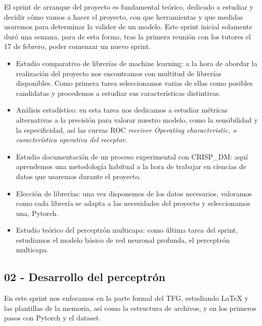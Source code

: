 El sprint de arranque del proyecto es fundamental teórico, dedicado a estudiar y decidir cómo vamos a hacer el proyecto, con que herramientas y que medidas usaremos para determinar la validez de un modelo. Este sprint inicial solamente duró una semana, para de esta forma, tras la primera reunión con los tutores el 17 de febrero, poder comenzar un nuevo sprint.

\begin{itemize}
    \item Estudio comparativo de librerías de machine learning: a la hora de abordar la realización del proyecto nos encontramos con multitud de librerías disponibles. Como primera tarea seleccionamos varias de ellas como posibles candidatas y procedemos a estudiar sus características distintivas.    
    \item Análisis estadístico: en esta tarea nos dedicamos a estudiar métricas alternativas a la precisión para valorar nuestro modelo, como la sensibilidad y la especificidad, así las curvas ROC \textit{receiver Operating characteristic, o característica operativa del receptor}.
    \item Estudio documentación de un proceso experimental con CRISP\_DM: aquí aprendemos una metodología habitual a la hora de trabajar en ciencias de datos que usaremos durante el proyecto.
    \item Elección de librerías: una vez disponemos de los datos necesarios, valoramos como cada librería se adapta a las necesidades del proyecto y seleccionamos una, Pytorch.
    \item Estudio teórico del perceptrón multicapa: como última tarea del sprint, estudiamos el modelo básico de red neuronal profunda, el perceptrón multicapa.
\end{itemize}


\subsection{02 - Desarrollo del perceptrón \newline
[02/03/2020 – 16/03/2020]}

En este sprint nos enfocamos en la parte formal del TFG, estudiando LaTeX y las plantillas de la memoria, así como la estructura de archivos, y en los primeros pasos con Pytorch y el dataset.

